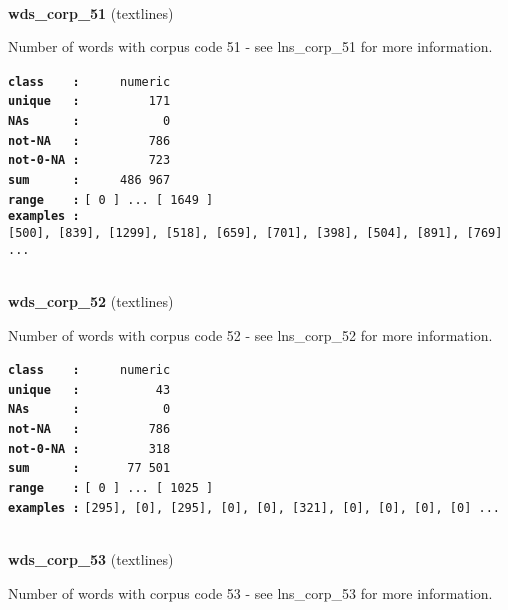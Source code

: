 \documentclass[]{article}
\begin{document}
~

\textbf{wds\_corp\_51} (textlines)

Number of words with corpus code 51 - see lns\_corp\_51 for more
information.

\textbf{\texttt{class\ \ \ \ :}} \texttt{~~~~~numeric}\\
\textbf{\texttt{unique\ \ \ :}} \texttt{~~~~~~~~~171}\\
\textbf{\texttt{NAs\ \ \ \ \ \ :}} \texttt{~~~~~~~~~~~0}\\
\textbf{\texttt{not-NA\ \ \ :}} \texttt{~~~~~~~~~786}\\
\textbf{\texttt{not-0-NA\ :}} \texttt{~~~~~~~~~723}\\
\textbf{\texttt{sum\ \ \ \ \ \ :}} \texttt{~~~~~486~967}\\
\textbf{\texttt{range\ \ \ \ :}}
\texttt{{[}\ 0\ {]}\ ...\ {[}\ 1649\ {]}}\\
\textbf{\texttt{examples\ :}}
\texttt{{[}500{]},\ {[}839{]},\ {[}1299{]},\ {[}518{]},\ {[}659{]},\ {[}701{]},\ {[}398{]},\ {[}504{]},\ {[}891{]},\ {[}769{]}\ ...}\\

~

\textbf{wds\_corp\_52} (textlines)

Number of words with corpus code 52 - see lns\_corp\_52 for more
information.

\textbf{\texttt{class\ \ \ \ :}} \texttt{~~~~~numeric}\\
\textbf{\texttt{unique\ \ \ :}} \texttt{~~~~~~~~~~43}\\
\textbf{\texttt{NAs\ \ \ \ \ \ :}} \texttt{~~~~~~~~~~~0}\\
\textbf{\texttt{not-NA\ \ \ :}} \texttt{~~~~~~~~~786}\\
\textbf{\texttt{not-0-NA\ :}} \texttt{~~~~~~~~~318}\\
\textbf{\texttt{sum\ \ \ \ \ \ :}} \texttt{~~~~~~77~501}\\
\textbf{\texttt{range\ \ \ \ :}}
\texttt{{[}\ 0\ {]}\ ...\ {[}\ 1025\ {]}}\\
\textbf{\texttt{examples\ :}}
\texttt{{[}295{]},\ {[}0{]},\ {[}295{]},\ {[}0{]},\ {[}0{]},\ {[}321{]},\ {[}0{]},\ {[}0{]},\ {[}0{]},\ {[}0{]}\ ...}\\

~

\textbf{wds\_corp\_53} (textlines)

Number of words with corpus code 53 - see lns\_corp\_53 for more
information.
\end{document}
